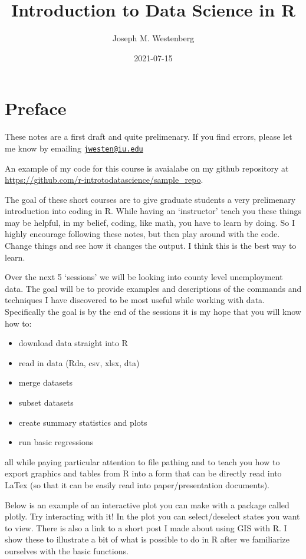 \documentclass[
]{book}
\title{Introduction to Data Science in R}
\author{Joseph M. Westenberg}
\date{2021-07-15}
\providecommand{\tightlist}{%
  \setlength{\itemsep}{0pt}\setlength{\parskip}{0pt}}
\begin{document}
\maketitle

{
\setcounter{tocdepth}{1}
\tableofcontents
}
\hypertarget{preface}{%
\chapter{Preface}\label{preface}}

These notes are a first draft and quite prelimenary. If you find errors, please let me know by emailing \href{mailto:jwesten@iu.edu}{\nolinkurl{jwesten@iu.edu}}

An example of my code for this course is avaialabe on my github repository at \url{https://github.com/r-introtodatascience/sample_repo}.

The goal of these short courses are to give graduate students a very prelimenary introduction into coding in R. While having an `instructor' teach you these things may be helpful, in my belief, coding, like math, you have to learn by doing. So I highly encourage following these notes, but then play around with the code. Change things and see how it changes the output. I think this is the best way to learn.

Over the next 5 `sessions' we will be looking into county level unemployment data. The goal will be to provide examples and descriptions of the commands and techniques I have discovered to be most useful while working with data. Specifically the goal is by the end of the sessions it is my hope that you will know how to:

\begin{itemize}
\tightlist
\item
  download data straight into R
\item
  read in data (Rda, csv, xlsx, dta)
\item
  merge datasets
\item
  subset datasets
\item
  create summary statistics and plots
\item
  run basic regressions
\end{itemize}

all while paying particular attention to file pathing and to teach you how to export graphics and tables from R into a form that can be directly read into LaTex (so that it can be easily read into paper/presentation documents).

Below is an example of an interactive plot you can make with a package called plotly. Try interacting with it! In the plot you can select/deselect states you want to view. There is also a link to a short post I made about using GIS with R. I show these to illustrate a bit of what is possible to do in R after we familiarize ourselves with the basic functions.
\end{document}
